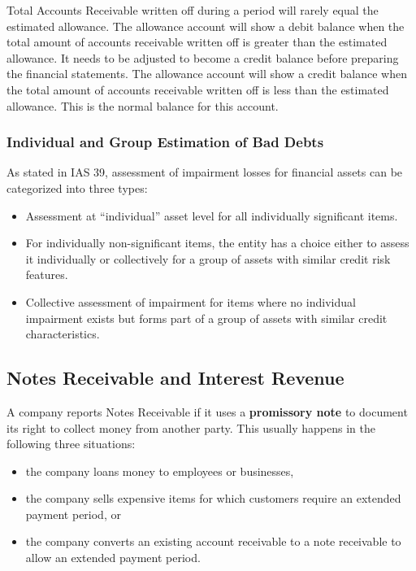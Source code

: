 \documentclass[../main.tex]{subfiles}
\begin{document}
	Total Accounts Receivable written off during a period will rarely equal the 
	estimated allowance. The allowance account will show a debit balance when 
	the total amount of accounts receivable written off is greater than the 
	estimated allowance.  It needs to be adjusted to become a credit balance 
	before preparing the financial statements. The allowance account will show 
	a credit balance when the total amount of accounts receivable written off 
	is less than the estimated allowance. This is the normal balance for this 
	account.
	
	\subsubsection{Individual and Group Estimation of Bad Debts}
	
	As stated in IAS 39, assessment of impairment losses for financial assets 
	can be categorized into three types:
	\begin{itemize}[noitemsep]
	\item Assessment at “individual” asset level for all individually 
	significant 
	items.
	\item For individually non-significant items, the entity has a choice 
	either 
	to assess it individually or collectively for a group of assets with 
	similar credit risk features.
	\item Collective assessment of impairment for items where no individual 
	impairment exists but forms part of a group of assets with similar credit 
	characteristics.
	\end{itemize}
	
	\subsection{Notes Receivable and Interest Revenue}
	
	A company reports Notes Receivable if it uses a \textbf{promissory note} to 
	document its right to collect money from another party. This usually 
	happens in the following three situations:
	\begin{itemize}[noitemsep]
		\item the company loans money to employees or businesses,
		\item the company sells expensive items for which customers require an 
		extended payment period, or
		\item the company converts an existing account receivable to a note 
		receivable to allow an extended payment period.
	\end{itemize}
	
\end{document}
